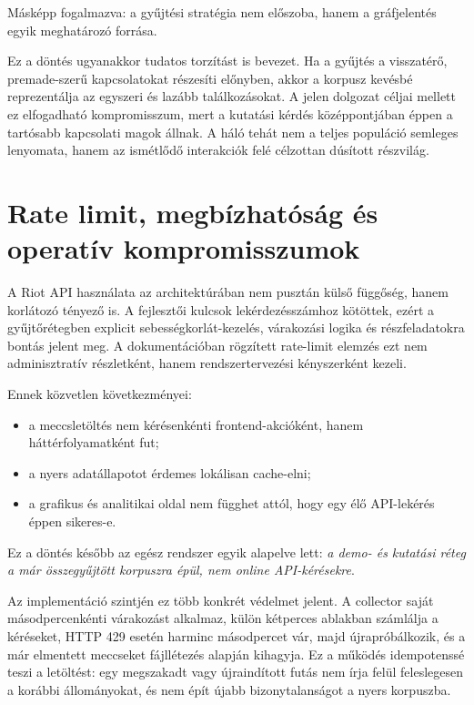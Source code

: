 Másképp fogalmazva: a gyűjtési stratégia nem előszoba, hanem a gráfjelentés egyik meghatározó forrása.

Ez a döntés ugyanakkor tudatos torzítást is bevezet. Ha a gyűjtés a visszatérő, premade-szerű kapcsolatokat részesíti előnyben, akkor a korpusz kevésbé reprezentálja az egyszeri és lazább találkozásokat. A jelen dolgozat céljai mellett ez elfogadható kompromisszum, mert a kutatási kérdés középpontjában éppen a tartósabb kapcsolati magok állnak. A háló tehát nem a teljes populáció semleges lenyomata, hanem az ismétlődő interakciók felé célzottan dúsított részvilág.

\section{Rate limit, megbízhatóság és operatív kompromisszumok}

A Riot API használata az architektúrában nem pusztán külső függőség, hanem korlátozó tényező is. A fejlesztői kulcsok lekérdezésszámhoz kötöttek, ezért a gyűjtőrétegben explicit sebességkorlát-kezelés, várakozási logika és részfeladatokra bontás jelent meg. A dokumentációban rögzített rate-limit elemzés ezt nem adminisztratív részletként, hanem rendszertervezési kényszerként kezeli.

Ennek közvetlen következményei:

\begin{itemize}
    \item a meccsletöltés nem kérésenkénti frontend-akcióként, hanem háttérfolyamatként fut;
    \item a nyers adatállapotot érdemes lokálisan cache-elni;
    \item a grafikus és analitikai oldal nem függhet attól, hogy egy élő API-lekérés éppen sikeres-e.
\end{itemize}

Ez a döntés később az egész rendszer egyik alapelve lett: \emph{a demo- és kutatási réteg a már összegyűjtött korpuszra épül, nem online API-kérésekre}.

Az implementáció szintjén ez több konkrét védelmet jelent. A collector saját másodpercenkénti várakozást alkalmaz, külön kétperces ablakban számlálja a kéréseket, HTTP 429 esetén harminc másodpercet vár, majd újrapróbálkozik, és a már elmentett meccseket fájllétezés alapján kihagyja. Ez a működés idempotenssé teszi a letöltést: egy megszakadt vagy újraindított futás nem írja felül feleslegesen a korábbi állományokat, és nem épít újabb bizonytalanságot a nyers korpuszba.


